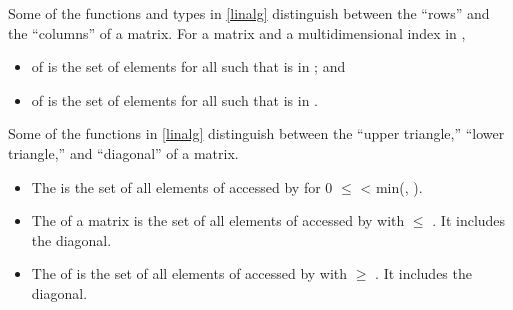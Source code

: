\pnum
Some of the functions and types in \ref{linalg} distinguish between
the ``rows'' and the ``columns'' of a matrix.
For a matrix  and a multidimensional index  in ,
\begin{itemize}
\item
{}  of  is the set of elements 
      for all  such that  is in ; and
\item
{}  of  is the set of elements 
      for all  such that  is in .
\end{itemize}

\pnum
Some of the functions in \ref{linalg} distinguish between
the ``upper triangle,'' ``lower triangle,'' and ``diagonal'' of a matrix.
\begin{itemize}
\item
The  is the set of all elements of  accessed by
       for 0 $\le$  < min(, ).
\item
The  of a matrix  is the set of all elements of
       accessed by  with  $\le$ .  It includes the diagonal.
\item
The  of  is the set of all elements of 
      accessed by  with  $\ge$ .  It includes the diagonal.
\end{itemize}

